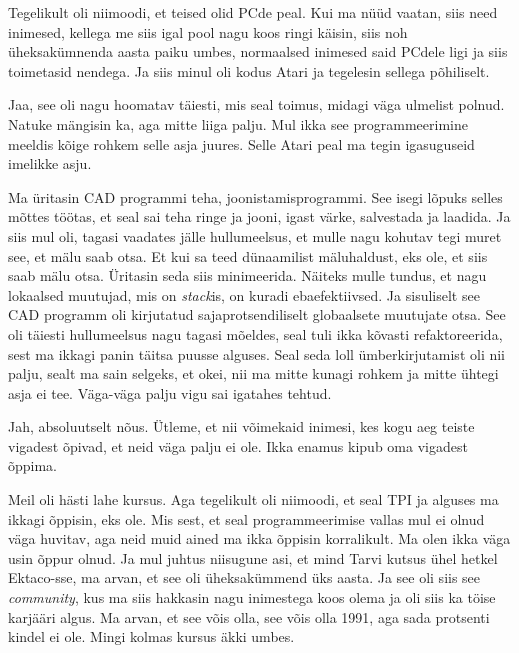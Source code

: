 Tegelikult oli niimoodi, et teised olid PCde peal. Kui ma nüüd vaatan, siis 
need inimesed, kellega me siis igal pool nagu koos ringi käisin, siis noh 
üheksakümnenda aasta paiku umbes, normaalsed inimesed said PCdele ligi ja siis 
toimetasid nendega.  Ja siis minul oli kodus Atari  ja tegelesin sellega 
põhiliselt. 


Jaa, see oli nagu hoomatav täiesti,  mis seal toimus, midagi väga ulmelist 
polnud. Natuke mängisin ka, aga mitte liiga palju. Mul ikka see 
programmeerimine meeldis kõige rohkem selle asja juures. Selle Atari peal ma 
tegin igasuguseid imelikke asju.

Ma üritasin CAD programmi teha, joonistamisprogrammi. See isegi lõpuks selles 
mõttes töötas, et seal sai teha ringe ja jooni, igast värke, salvestada ja 
laadida. Ja siis mul oli, tagasi vaadates jälle hullumeelsus, et mulle nagu 
kohutav tegi muret see, et mälu saab otsa. Et kui sa teed dünaamilist 
mäluhaldust, eks ole, et siis saab mälu otsa. Üritasin seda siis minimeerida. 
Näiteks mulle tundus, et nagu lokaalsed muutujad, mis on \emph{stack}is, on 
kuradi ebaefektiivsed. Ja sisuliselt see CAD programm oli kirjutatud 
sajaprotsendiliselt globaalsete muutujate otsa. See oli täiesti hullumeelsus 
nagu tagasi mõeldes, seal tuli ikka kõvasti refaktoreerida, sest ma ikkagi panin 
täitsa puusse alguses. Seal seda loll ümberkirjutamist oli nii palju, sealt ma 
sain selgeks, et okei, nii ma mitte kunagi rohkem ja mitte ühtegi asja ei tee. 
Väga-väga palju vigu sai igatahes tehtud.


Jah, absoluutselt nõus. Ütleme, et nii võimekaid inimesi, kes kogu aeg teiste 
vigadest õpivad, et neid väga palju ei ole. Ikka enamus kipub oma vigadest 
õppima. 


Meil oli hästi lahe kursus. Aga tegelikult oli niimoodi, et seal TPI ja alguses 
ma ikkagi õppisin, eks ole. Mis sest, et seal programmeerimise vallas mul ei 
olnud väga huvitav, aga neid muid ained ma ikka õppisin korralikult. Ma olen 
ikka väga usin õppur olnud. Ja mul juhtus niisugune asi, et mind 
Tarvi kutsus ühel hetkel Ektaco-sse, 
ma arvan, et see oli üheksakümmend üks aasta. Ja see oli siis see 
\emph{community}, kus ma siis hakkasin nagu inimestega koos olema ja oli siis 
ka töise karjääri algus. Ma arvan, et see võis olla, see võis olla 1991, aga  
sada protsenti kindel ei ole. Mingi kolmas kursus äkki umbes.

